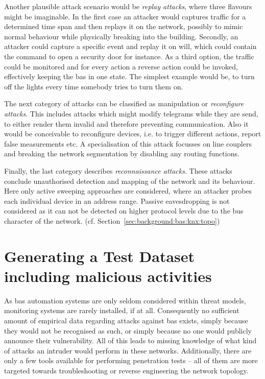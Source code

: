 Another plausible attack scenario would be \emph{replay attacks}, where three flavours might be imaginable.
In the first case an attacker would captures traffic for a determined time span and then replays it on the network, possibly to mimic normal behaviour while physically breaking into the building.
Secondly, an attacker could capture a specific event and replay it on will, which could contain the command to open a security door for instance.
As a third option, the traffic could be monitored and for every action a reverse action could be invoked, effectively keeping the \gls{bas} in one state. The simplest example would be, to turn off the lights every time somebody tries to turn them on.

The next category of attacks can be classified as manipulation or \emph{reconfigure attacks}. This includes attacks which might modify telegrams while they are send, to either render them invalid and therefore preventing communication. Also it would be conceivable to reconfigure devices, i.e. to trigger different actions, report false measurements etc. A specialisation of this attack focusses on line couplers and breaking the network segmentation by disabling any routing functions.

Finally, the last category describes \emph{reconnaissance attacks}. These attacks conclude unauthorised detection and mapping of the network and its behaviour. Here only active sweeping approaches are considered, where an attacker probes each individual device in an address range.
Passive eavesdropping is not considered as it can not be detected on higher protocol levels due to the bus character of the network. (cf. Section~\ref{sec:background:bas:knx:topo})

\section{Generating a Test Dataset including malicious activities}
\label{sec:methods:gen-test}

As \gls{bas} automation systems are only seldom considered within threat models, monitoring systems are rarely installed, if at all.
Consequently no sufficient amount of empirical data regarding attacks against \gls{bas} exists, simply because they would not be recognised as such, or simply because no one would publicly announce their vulnerability.
All of this leads to missing knowledge of what kind of attacks an intruder would perform in these networks.
Additionally, there are only a few tools available for performing penetration tests -- all of them are more targeted towards troubleshooting or reverse engineering the network topology.

